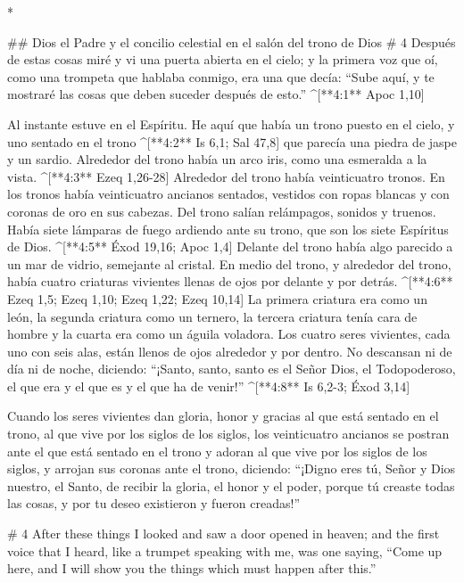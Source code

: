 \begin{paracols}{2}
\begin{english}
\end{english}
\switchcolumn[0]*

## Dios el Padre y el concilio celestial en el salón del trono de Dios
# 4
 Después de estas cosas miré y vi una puerta abierta en el cielo; y la primera voz que oí, como una trompeta que hablaba conmigo, era una que decía: “Sube aquí, y te mostraré las cosas que deben suceder después de esto.” ^[**4:1** Apoc 1,10]

 Al instante estuve en el Espíritu. He aquí que había un trono puesto en el cielo, y uno sentado en el trono ^[**4:2** Is 6,1; Sal 47,8]  que parecía una piedra de jaspe y un sardio. Alrededor del trono había un arco iris, como una esmeralda a la vista. ^[**4:3** Ezeq 1,26-28]  Alrededor del trono había veinticuatro tronos. En los tronos había veinticuatro ancianos sentados, vestidos con ropas blancas y con coronas de oro en sus cabezas.  Del trono salían relámpagos, sonidos y truenos. Había siete lámparas de fuego ardiendo ante su trono, que son los siete Espíritus de Dios. ^[**4:5** Éxod 19,16; Apoc 1,4]  Delante del trono había algo parecido a un mar de vidrio, semejante al cristal. En medio del trono, y alrededor del trono, había cuatro criaturas vivientes llenas de ojos por delante y por detrás. ^[**4:6** Ezeq 1,5; Ezeq 1,10; Ezeq 1,22; Ezeq 10,14]  La primera criatura era como un león, la segunda criatura como un ternero, la tercera criatura tenía cara de hombre y la cuarta era como un águila voladora.  Los cuatro seres vivientes, cada uno con seis alas, están llenos de ojos alrededor y por dentro. No descansan ni de día ni de noche, diciendo: “¡Santo, santo, santo es el Señor Dios, el Todopoderoso, el que era y el que es y el que ha de venir!” ^[**4:8** Is 6,2-3; Éxod 3,14]

 Cuando los seres vivientes dan gloria, honor y gracias al que está sentado en el trono, al que vive por los siglos de los siglos,  los veinticuatro ancianos se postran ante el que está sentado en el trono y adoran al que vive por los siglos de los siglos, y arrojan sus coronas ante el trono, diciendo:  “¡Digno eres tú, Señor y Dios nuestro, el Santo, de recibir la gloria, el honor y el poder, porque tú creaste todas las cosas, y por tu deseo existieron y fueron creadas!”

\switchcolumn
\begin{english}

# 4
 After these things I looked and saw a door opened in heaven; and the first voice that I heard, like a trumpet speaking with me, was one saying, “Come up here, and I will show you the things which must happen after this.” 


\end{english}
\end{paracols}
